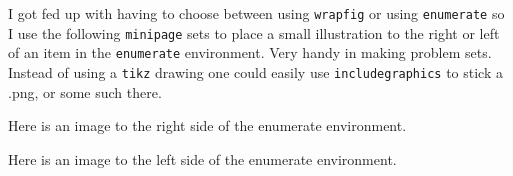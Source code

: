 \documentclass[tikz]{article}
\begin{document}
I got fed up with having to choose between using \texttt{wrapfig} or using \texttt{enumerate} so I use the following \texttt{minipage} sets to place a small illustration to the right or left of an item in the \texttt{enumerate} environment. Very handy in making problem sets. Instead of using a \texttt{tikz} drawing one could easily use \texttt{includegraphics} to stick a .png, or some such there.


\begin{enumerate}

\begin{minipage}{0.7\textwidth}
\item Here is an image to the right side of the enumerate environment.
\end{minipage} \hfill
\hspace{.5cm}
\begin{minipage}{0.2\textwidth}
\end{minipage}


\begin{minipage}{0.2\textwidth}
\end{minipage}  \hfill
\hspace{.5cm}
\begin{minipage}{0.7\textwidth}
\item Here is an image to the left side of the enumerate environment.
\end{minipage}

\end{enumerate}
\end{document}
